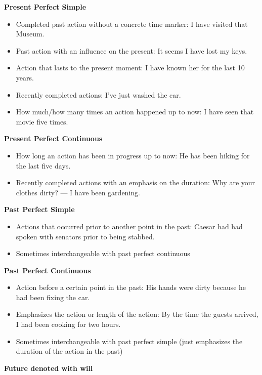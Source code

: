 \documentclass[a4paper,12pt]{report}
\begin{document}
\noindent
\textbf{Present Perfect Simple}

\begin{itemize}
	\item Completed past action without a concrete time marker: I have visited that Museum.
	\item Past action with an influence on the present: It seems I have lost my keys.
	\item Action that lasts to the present moment: I have known her for the last 10 years.
	\item Recently completed actions: I've just washed the car.
	\item How much/how many times an action happened up to now: I have seen that movie five times.
\end{itemize}

\noindent
\textbf{Present Perfect Continuous}

\begin{itemize}
	\item How long an action has been in progress up to now: He has been hiking for the last five days.
	\item Recently completed actions with an emphasis on the duration: Why are your clothes dirty? — I have been gardening.
\end{itemize}

\noindent
\textbf{Past Perfect Simple}

\begin{itemize}
	\item Actions that occurred prior to another point in the past: Caesar had had spoken with senators prior to being stabbed.
	\item Sometimes interchangeable with past perfect continuous
\end{itemize}

\noindent
\textbf{Past Perfect Continuous}

\begin{itemize}
	\item Action before a certain point in the past: His hands were dirty because he had been fixing the car.
	\item Emphasizes the action or length of the action: By the time the guests arrived, I had been cooking for two hours.
	\item Sometimes interchangeable with past perfect simple (just emphasizes the duration of the action in the past)
\end{itemize}

\noindent
\textbf{Future denoted with will}
\end{document}

